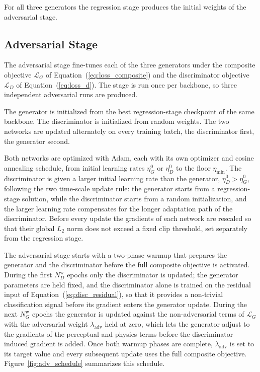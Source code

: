 For all three generators the regression stage produces the initial weights of the adversarial stage.


\subsection{Adversarial Stage}
\label{subsec:method_training_adversarial}

The adversarial stage fine-tunes each of the three generators under the composite objective $\mathcal{L}_G$ of Equation~(\ref{eq:loss_composite}) and the discriminator objective $\mathcal{L}_D$ of Equation~(\ref{eq:loss_d}). The stage is run once per backbone, so three independent adversarial runs are produced.

The generator is initialized from the best regression-stage checkpoint of the same backbone. The discriminator is initialized from random weights. The two networks are updated alternately on every training batch, the discriminator first, the generator second.

Both networks are optimized with Adam, each with its own optimizer and cosine annealing schedule, from initial learning rates $\eta_G^{0}$ or $\eta_D^{0}$ to the floor $\eta_{\min}$. The discriminator is given a larger initial learning rate than the generator, $\eta_D^{0} > \eta_G^{0}$, following the two time-scale update rule: the generator starts from a regression-stage solution, while the discriminator starts from a random initialization, and the larger learning rate compensates for the longer adaptation path of the discriminator. Before every update the gradients of each network are rescaled so that their global $L_2$ norm does not exceed a fixed clip threshold, set separately from the regression stage.

The adversarial stage starts with a two-phase warmup that prepares the generator and the discriminator before the full composite objective is activated. During the first $N_D^{\mathrm{w}}$ epochs only the discriminator is updated; the generator parameters are held fixed, and the discriminator alone is trained on the residual input of Equation~(\ref{eq:disc_residual}), so that it provides a non-trivial classification signal before its gradient enters the generator update. During the next $N_G^{\mathrm{w}}$ epochs the generator is updated against the non-adversarial terms of $\mathcal{L}_G$ with the adversarial weight $\lambda_{\mathrm{adv}}$ held at zero, which lets the generator adjust to the gradients of the perceptual and physics terms before the discriminator-induced gradient is added. Once both warmup phases are complete, $\lambda_{\mathrm{adv}}$ is set to its target value and every subsequent update uses the full composite objective. Figure~\ref{fig:adv_schedule} summarizes this schedule.

